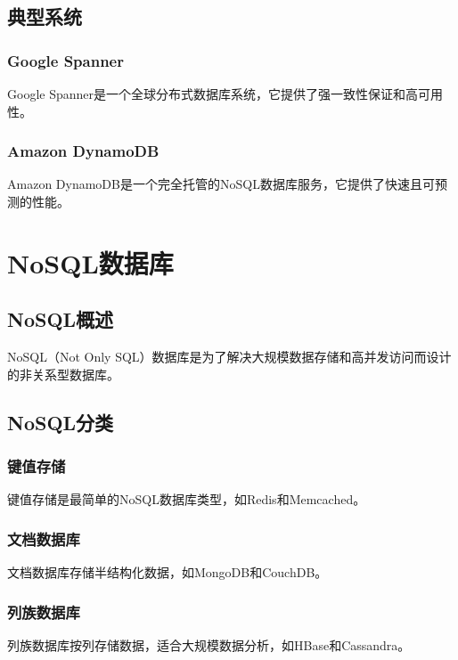 \documentclass{report-uestc}
\begin{document}
\section{典型系统}

\subsection{Google Spanner}

Google Spanner是一个全球分布式数据库系统，它提供了强一致性保证和高可用性。

\subsection{Amazon DynamoDB}

Amazon DynamoDB是一个完全托管的NoSQL数据库服务，它提供了快速且可预测的性能。

\chapter{NoSQL数据库}

\section{NoSQL概述}

NoSQL（Not Only SQL）数据库是为了解决大规模数据存储和高并发访问而设计的非关系型数据库。

\section{NoSQL分类}

\subsection{键值存储}

键值存储是最简单的NoSQL数据库类型，如Redis和Memcached。

\subsection{文档数据库}

文档数据库存储半结构化数据，如MongoDB和CouchDB。

\subsection{列族数据库}

列族数据库按列存储数据，适合大规模数据分析，如HBase和Cassandra。
\end{document}
